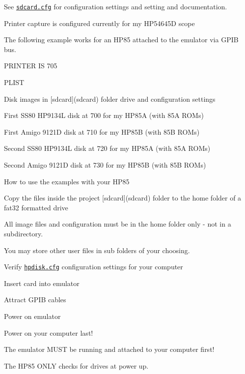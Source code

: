 \begin{DoxyItemize}
\item See \href{sdcard/sdcard.cfg}{\tt sdcard.\+cfg} for configuration settings and setting and documentation.
\begin{DoxyItemize}
\item Printer capture is configured currently for my H\+P54645D scope
\begin{DoxyItemize}
\item The following example works for an H\+P85 attached to the emulator via G\+P\+IB bus.
\begin{DoxyItemize}
\item P\+R\+I\+N\+T\+ER IS 705
\item P\+L\+I\+ST
\end{DoxyItemize}
\end{DoxyItemize}
\item Disk images in \mbox{[}sdcard\mbox{]}(sdcard) folder drive and configuration settings
\begin{DoxyItemize}
\item First S\+S80 H\+P9134L disk at 700 for my H\+P85A (with 85A R\+O\+Ms)
\item First Amigo 9121D disk at 710 for my H\+P85B (with 85B R\+O\+Ms)
\item Second S\+S80 H\+P9134L disk at 720 for my H\+P85A (with 85A R\+O\+Ms)
\item Second Amigo 9121D disk at 730 for my H\+P85B (with 85B R\+O\+Ms)
\end{DoxyItemize}
\item How to use the examples with your H\+P85
\begin{DoxyItemize}
\item Copy the files inside the project \mbox{[}sdcard\mbox{]}(sdcard) folder to the home folder of a fat32 formatted drive
\begin{DoxyItemize}
\item All image files and configuration must be in the home folder only -\/ not in a subdirectory.
\item You may store other user files in sub folders of your choosing.
\end{DoxyItemize}
\item Verify \href{sdcard/hpdisk.cfg}{\tt hpdisk.\+cfg} configuration settings for your computer
\item Insert card into emulator
\item Attract G\+P\+IB cables
\item Power on emulator
\item Power on your computer last!
\begin{DoxyItemize}
\item The emulator M\+U\+ST be running and attached to your computer first!
\item The H\+P85 O\+N\+LY checks for drives at power up. 


\end{DoxyItemize}
\end{DoxyItemize}
\end{DoxyItemize}
\end{DoxyItemize}

